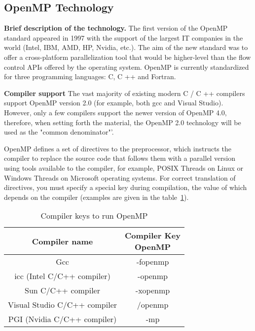 { %
	\subsection{OpenMP Technology}
	\label{OpenMP:section}
	\par\textbf{Brief description of the technology.} The first version of the OpenMP standard appeared in 1997 with the support of the largest IT companies in the world (Intel, IBM, AMD, HP, Nvidia, etc.). The aim of the new standard was to offer a cross-platform parallelization tool that would be higher-level than the flow control APIs offered by the operating system. OpenMP is currently standardized for three programming languages: C, C ++ and Fortran.
	\par\textbf{Compiler support} The vast majority of existing modern C / C ++ compilers support OpenMP version 2.0 (for example, both gcc and Visual Studio). However, only a few compilers support the newer version of OpenMP 4.0, therefore, when setting forth the material, the OpenMP 2.0 technology will be used as the "common denominator"'.
	\par OpenMP defines a set of directives to the preprocessor, which instructs the compiler to replace the source code that follows them with a parallel version using tools available to the compiler, for example, POSIX Threads on Linux or Windows Threads on Microsoft operating systems. For correct translation of directives, you must specify a special key during compilation, the value of which depends on the compiler (examples are given in the table~\ref{compilerOpenMP:table}).
	\begin{table}[H]
		\caption{Compiler keys to run OpenMP}
		\label{compilerOpenMP:table}
		\begin{center}
			\begin{tabular}{|c|c|}
				\hline
				\textbf{Compiler name} & \specialcell{\textbf{Compiler Key} \\  \textbf{OpenMP}} \\
				\hline
				Gcc & -fopenmp \\
				\hline
				icc (Intel C/C++ compiler) & -openmp \\
				\hline
				Sun C/C++ compiler & -xopenmp \\
				\hline
				Visual Studio C/C++ compiler & /openmp \\
				\hline
				PGI (Nvidia C/C++ compiler) & -mp \\
				\hline
			\end{tabular}
		\end{center}

\end{table}}
